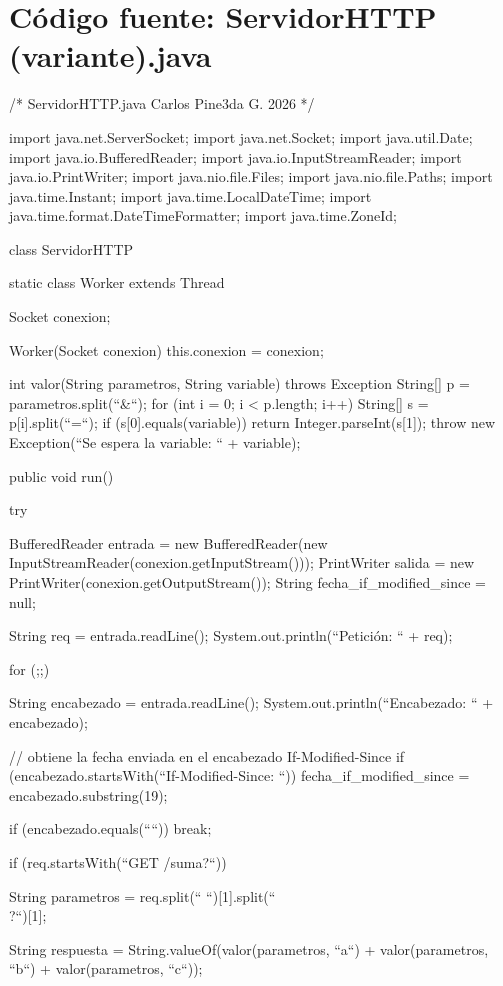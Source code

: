 \chapter{Código fuente: ServidorHTTP (variante).java}
\begin{SourceCode}
/*
  ServidorHTTP.java
  Carlos Pine3da G. 2026
*/

import java.net.ServerSocket;
import java.net.Socket;
import java.util.Date;
import java.io.BufferedReader;
import java.io.InputStreamReader;
import java.io.PrintWriter;
import java.nio.file.Files;
import java.nio.file.Paths;
import java.time.Instant;
import java.time.LocalDateTime;
import java.time.format.DateTimeFormatter;
import java.time.ZoneId;

class ServidorHTTP
{
  static class Worker extends Thread
  {
    Socket conexion;

    Worker(Socket conexion)
    {
      this.conexion = conexion;
    }

    int valor(String parametros, String variable) throws Exception
    {
      String[] p = parametros.split(``&``);
      for (int i = 0; i < p.length; i++)
      {
        String[] s = p[i].split(``=``);
        if (s[0].equals(variable))
          return Integer.parseInt(s[1]);
      }
      throw new Exception(``Se espera la variable: `` + variable);
    }

    public void run()
    {
      try
      {
        BufferedReader entrada = new BufferedReader(new InputStreamReader(conexion.getInputStream()));
        PrintWriter salida = new PrintWriter(conexion.getOutputStream());
        String fecha_if_modified_since = null;

        String req = entrada.readLine();
        System.out.println(``Petición: `` + req);

        for (;;)
        {
          String encabezado = entrada.readLine();
          System.out.println(``Encabezado: `` + encabezado);

          // obtiene la fecha enviada en el encabezado If-Modified-Since
          if (encabezado.startsWith(``If-Modified-Since: ``))
	          fecha_if_modified_since = encabezado.substring(19);

          if (encabezado.equals(````)) break;
        }

        if (req.startsWith(``GET /suma?``))
        {
          String parametros = req.split(`` ``)[1].split(``\\?``)[1];

          String respuesta = String.valueOf(valor(parametros, ``a``) + valor(parametros, ``b``) + valor(parametros, ``c``));

}}}}}
\end{SourceCode}
